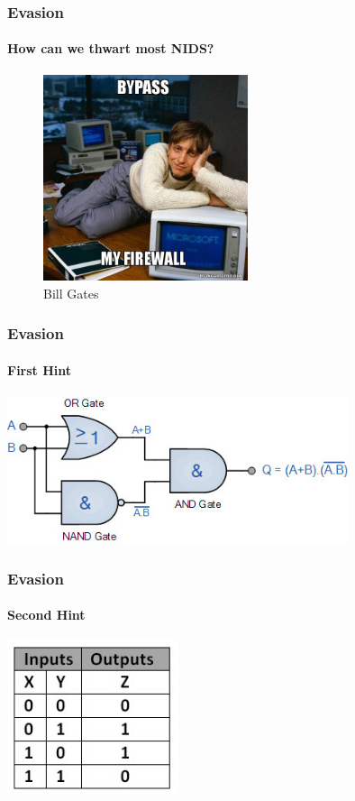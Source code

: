 \documentclass[aspectratio=169]{beamer}
\begin{document}
\begin{frame}
  \frametitle{Evasion}
  \framesubtitle{How can we thwart most NIDS?}
  \begin{center}
    \begin{figure}
      \includegraphics[width=6cm,keepaspectratio]{bypass_firewall}
      \caption{Bill Gates}
    \end{figure}
  \end{center}
\end{frame}

\begin{frame}
  \frametitle{Evasion}
  \framesubtitle{First Hint}
  \begin{center}
    \includegraphics[width=10cm,keepaspectratio]{xor_gate}
  \end{center}
\end{frame}

\begin{frame}
  \frametitle{Evasion}
  \framesubtitle{Second Hint}
  \begin{center}
    \includegraphics[width=5cm,keepaspectratio]{xor_truth_table}
  \end{center}
\end{frame}
\end{document}
